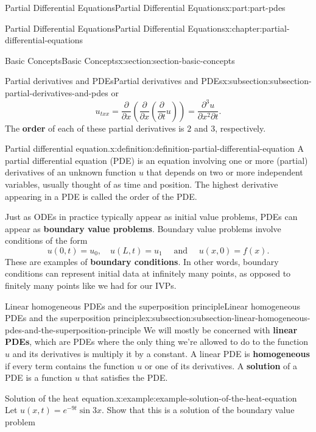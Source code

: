 \documentclass[oneside,10pt,]{book}
\newcommand{\terminology}[1]{\textbf{#1}}
\numberwithin{equation}{part}
\begin{document}
\begin{partptx}{Partial Differential Equations}{}{Partial Differential Equations}{}{}{x:part:part-pdes}
\begin{chapterptx}{Partial Differential Equations}{}{Partial Differential Equations}{}{}{x:chapter:partial-differential-equations}
\begin{sectionptx}{Basic Concepts}{}{Basic Concepts}{}{}{x:section:section-basic-concepts}
\begin{subsectionptx}{Partial derivatives and PDEs}{}{Partial derivatives and PDEs}{}{}{x:subsection:subsection-partial-derivatives-and-pdes}
or%
\begin{equation*}
u_{txx} = \frac{\partial}{\partial x}\left(\frac{\partial}{\partial x}\left(\frac{\partial}{\partial t}u\right)\right) = \frac{\partial^{3}u}{\partial x^{2}\partial t}.
\end{equation*}
The \terminology{order} of each of these partial derivatives is \(2\) and \(3\), respectively.%
\begin{definition}{Partial differential equation.}{x:definition:definition-partial-differential-equation}%
%
A partial differential equation (PDE) is an equation involving one or more (partial) derivatives of an unknown function \(u\) that depends on two or more independent variables, usually thought of as time and position. The highest derivative appearing in a PDE is called the order of the PDE.%
\end{definition}
Just as ODEs in practice typically appear as initial value problems, PDEs can appear as \terminology{boundary value problems}. Boundary value problems involve conditions of the form%
\begin{equation*}
u(0,t) = u_{0},\quad u(L,t) = u_{1} \quad \text{ and }\quad u(x,0) = f(x).
\end{equation*}
These are examples of \terminology{boundary conditions}. In other words, boundary conditions can represent initial data at infinitely many points, as opposed to finitely many points like we had for our IVPs.%
\end{subsectionptx}
%
%
\typeout{************************************************}
\typeout{************************************************}
%
\begin{subsectionptx}{Linear homogeneous PDEs and the superposition principle}{}{Linear homogeneous PDEs and the superposition principle}{}{}{x:subsection:subsection-linear-homogeneous-pdes-and-the-superposition-principle}
We will mostly be concerned with \terminology{linear PDEs}, which are PDEs where the only thing we're allowed to do to the function \(u\) and its derivatives is multiply it by a constant. A linear PDE is \terminology{homogeneous} if every term contains the function \(u\) or one of its derivatives. A \terminology{solution} of a PDE is a function \(u\) that satisfies the PDE.%
\begin{example}{Solution of the heat equation.}{x:example:example-solution-of-the-heat-equation}%
Let \(u(x,t) = e^{-9t}\sin3x\). Show that this is a solution of the boundary value problem%

\end{example}
\end{subsectionptx}
\end{sectionptx}
\end{chapterptx}
\end{partptx}
\end{document}
